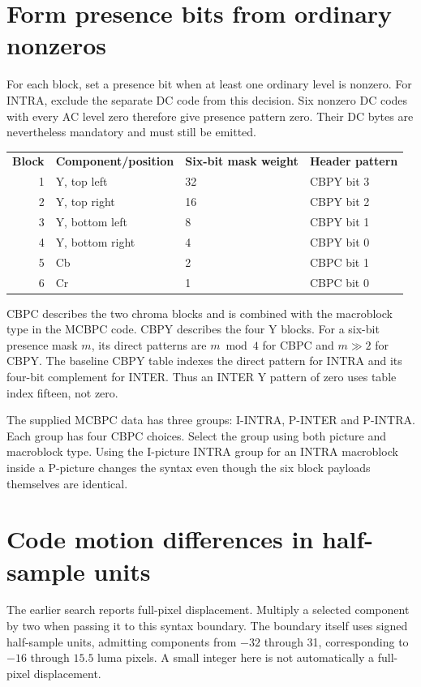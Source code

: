 \section{Form presence bits from ordinary nonzeros}
For each block, set a presence bit when at least one ordinary level is nonzero.
For INTRA, exclude the separate DC code from this decision. Six nonzero DC codes
with every AC level zero therefore give presence pattern zero. Their DC bytes
are nevertheless mandatory and must still be emitted.

\begin{center}
  \begin{tabular}{rlll}
    \textbf{Block} & \textbf{Component/position} & \textbf{Six-bit mask weight} & \textbf{Header pattern} \\
    1              & Y, top left                 & 32                           & CBPY bit 3              \\
    2              & Y, top right                & 16                           & CBPY bit 2              \\
    3              & Y, bottom left              & 8                            & CBPY bit 1              \\
    4              & Y, bottom right             & 4                            & CBPY bit 0              \\
    5              & Cb                          & 2                            & CBPC bit 1              \\
    6              & Cr                          & 1                            & CBPC bit 0
  \end{tabular}
\end{center}
CBPC describes the two chroma blocks and is combined with the macroblock type in
the MCBPC code. CBPY describes the four Y blocks. For a six-bit presence mask $m$,
its direct patterns are $m\bmod4$ for CBPC and $m\gg2$ for CBPY. The baseline
CBPY table indexes the direct pattern for INTRA and its four-bit complement for
INTER. Thus an INTER Y pattern of zero uses table index fifteen, not zero.

The supplied MCBPC data has three groups: I-INTRA, P-INTER and P-INTRA. Each group
has four CBPC choices. Select the group using both picture and macroblock type.
Using the I-picture INTRA group for an INTRA macroblock inside a P-picture changes
the syntax even though the six block payloads themselves are identical.

\section{Code motion differences in half-sample units}
The earlier search reports full-pixel displacement. Multiply a selected component
by two when passing it to this syntax boundary. The boundary itself uses signed
half-sample units, admitting components from $-32$ through 31, corresponding to
$-16$ through $15.5$ luma pixels. A small integer here is not automatically a
full-pixel displacement.

